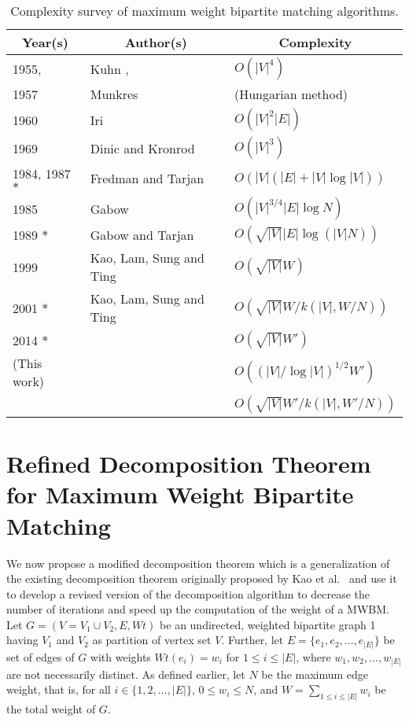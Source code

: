 \documentclass[runningheads,a4paper]{llncs}
\begin{document}
\begin{table*}[htpb]
\centering
\caption{Complexity survey of maximum weight bipartite matching algorithms.}
\label{Table:MWBM}
\begin{tabular}{|l|l|l|} 	\hline
 \multicolumn{1}{|c|}{\bf Year(s)}		&  \multicolumn{1}{|c|}{\bf Author(s)}	& \multicolumn{1}{|c|}{\bf Complexity} \\
\hline
1955,				& Kuhn \cite{kuhn55},				& $O(|V|^4)$ 		\\
1957				& Munkres \cite{munkres57} 				& (Hungarian method)	\\
\hline
1960				& Iri \cite{iri60,schrijver03} 			& $O(|V|^2 |E|)$	\\
\hline
1969				& Dinic and Kronrod \cite{dinic69,schrijver03} 			& $O(|V|^3)$	\\
\hline
1984, 1987 $*$	&Fredman and Tarjan \cite{fredman87}  	& $O(|V|(|E|+|V|\log |V|))$	\\
\hline
1985  			&Gabow \cite{gabow85} 					& $O(|V|^{3/4} |E| \log N)$	\\
\hline
1989 $*$			& Gabow and Tarjan \cite{gabow89}	 	& $O(\sqrt{|V|} |E| \log(|V|N))$	\\
\hline
1999 			& Kao, Lam, Sung and Ting \cite{kao99}		 		& $O(\sqrt{|V|}W)$  \\
\hline
2001	 $*$			& Kao, Lam, Sung and Ting \cite{kao02} 				& $O(\sqrt{|V|}W/k(|V|,W/N))$  \\
\hline
2014 $*$ & 		 & $O(\sqrt{|V|}W')$\\
\cline{3-3}
(This work)	& 	& $O((|V|/\log |V|)^{1/2}W')$	\\
\cline{3-3}
			& 	& $O(\sqrt{|V|}W'/k(|V|,W'/{N}))$	\\
\cline{3-3}
\hline
\end{tabular}
\end{table*}







\section[Refined Decomposition Theorem for MWBM]
{Refined Decomposition Theorem for Maximum Weight Bipartite Matching}
\label{Decomposition}
We now propose a modified decomposition theorem which is a generalization of the existing decomposition theorem originally proposed by Kao et al.~\cite{kao02,kao99}
and use it to develop a revised  version of the decomposition algorithm to decrease the
number of iterations and speed up the computation of the weight of a MWBM.
Let $G = (V = V_1 \cup V_2 , E, \textit{Wt})$ be an undirected, weighted bipartite graph 1
having $V_1$ and $V_2$ as partition
of vertex set $V$. Further, let $E=\{e_1,e_2,\ldots,e_{|E|}\}$ be set of
edges of $G$ with weights $\textit{Wt}(e_i)=w_i$ for $1 \leq i \leq |E|$, where  $w_1, w_2, \ldots, w_{|E|}$ are
not necessarily distinct. As defined earlier, let $N$ be the maximum edge
weight, that is, for all $i \in \{1,2,\ldots, |E|\}$, $0 \leq w_i \leq N$, and
 $W=\sum_{1 \leq i \leq |E|} w_i $ be the total weight of  $G$.
\end{document}
